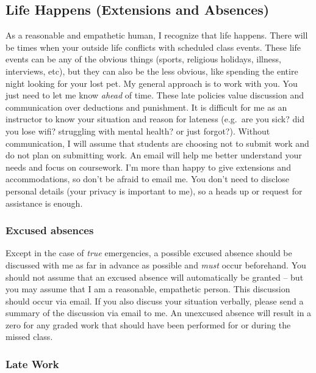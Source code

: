 \documentclass[11pt,]{article}
\begin{document}
\hypertarget{life-happens-extensions-and-absences}{%
\subsection{Life Happens (Extensions and
Absences)}\label{life-happens-extensions-and-absences}}

As a reasonable and empathetic human, I recognize that life happens.
There will be times when your outside life conflicts with scheduled
class events. These life events can be any of the obvious things
(sports, religious holidays, illness, interviews, etc), but they can
also be the less obvious, like spending the entire night looking for
your lost pet. My general approach is to work with you. You just need to
let me know \emph{ahead} of time. These late policies value discussion
and communication over deductions and punishment. It is difficult for me
as an instructor to know your situation and reason for lateness
(e.g.~are you sick? did you lose wifi? struggling with mental health? or
just forgot?). Without communication, I will assume that students are
choosing not to submit work and do not plan on submitting work. An email
will help me better understand your needs and focus on coursework. I'm
more than happy to give extensions and accommodations, so don't be
afraid to email me. You don't need to disclose personal details (your
privacy is important to me), so a heads up or request for assistance is
enough.

\hypertarget{excused-absences}{%
\subsubsection{Excused absences}\label{excused-absences}}

Except in the case of \emph{true} emergencies, a possible excused
absence should be discussed with me as far in advance as possible and
\emph{must} occur beforehand. You should not assume that an excused
absence will automatically be granted -- but you may assume that I am a
reasonable, empathetic person. This discussion should occur via email.
If you also discuss your situation verbally, please send a summary of
the discussion via email to me. An unexcused absence will result in a
zero for any graded work that should have been performed for or during
the missed class.

\hypertarget{late-work}{%
\subsubsection{Late Work}\label{late-work}}
\end{document}
